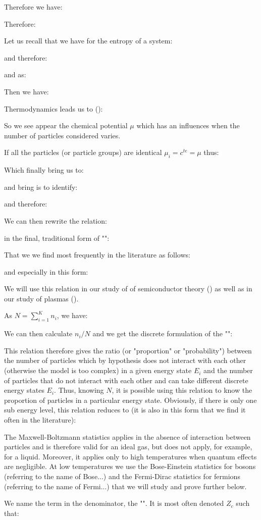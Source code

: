 	Therefore we have:
	
	Therefore:
	
	Let us recall that we have for the entropy of a system:
	
	and therefore:
	
	and as:
	
	Then we have:
	
	Thermodynamics leads us to ():
	
	So we see appear the chemical potential $\mu$ which has an influences when the number of particles considered varies.

	If all the particles (or particle groups) are identical $\mu_i=c^{te}=\mu$ thus:
	
	Which finally bring us to:
	
	and bring is to identify:
	
	and therefore:
	
	We can then rewrite the relation:
	
	in the final, traditional form of "":
	
	That we we find most frequently in the literature as follows:
	
	and especially in this form:
	
	We will use this relation in our study of of semiconductor theory () as well as in our study of plasmas ().

	As $N=\sum_{i=1}^K n_i$, we have:
	
	We can then calculate $n_i/N$ and we get the discrete formulation of the "":
	
	This relation therefore gives the ratio (or "proportion" or "probability") between the number of particles which by hypothesis does not interact with each other (otherwise the model is too complex) in a given energy state $E_i$ and the number of particles that do not interact with each other and can take different discrete energy states $E_i$. Thus, knowing $N$, it is possible using this relation to know the proportion of particles in a particular energy state.
	Obviously, if there is only one sub energy level, this relation reduces to (it is also in this form that we find it often in the literature):
	
	\begin{tcolorbox}[title=Remark,colframe=black,arc=10pt]
	The Maxwell-Boltzmann statistics applies in the absence of interaction between particles and is therefore valid for an ideal gas, but does not apply, for example, for a liquid. Moreover, it applies only to high temperatures when quantum effects are negligible. At low temperatures we use the Bose-Einstein statistics for bosons (referring to the name of Bose...) and the Fermi-Dirac statistics for fermions (referring to the name of Fermi...) that we will study and prove further below.
	\end{tcolorbox}
	We name the term in the denominator, the "". It is most often denoted $Z_c$ such that:
	
